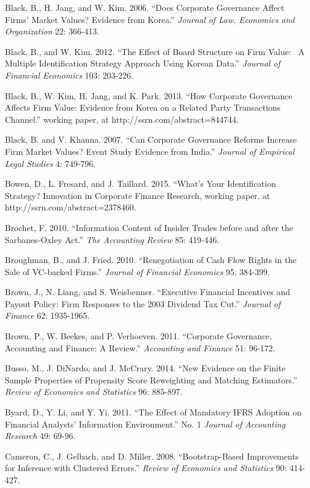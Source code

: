 \noindent Black, B., H. Jang, and W. Kim. 2006. ``Does Corporate Governance Affect Firms' Market Values?  Evidence from Korea.''  \textit{Journal of Law, Economics and Organization} 22: 366-413.

\noindent Black, B., and W. Kim. 2012. ``The Effect of Board Structure on Firm Value:~ A Multiple Identification Strategy Approach Using Korean Data.''  \textit{Journal of Financial Economics }103: 203-226.

\noindent Black, B., W. Kim, H. Jang, and K. Park. 2013. ``How Corporate Governance Affects Firm Value:  Evidence from Korea on a Related Party Transactions Channel.'' working paper, at http://ssrn.com/abstract=844744.

\noindent Black, B. and V. Khanna. 2007. ``Can Corporate Governance Reforms Increase Firm Market Values? Event Study Evidence from India.''  \textit{Journal of Empirical Legal Studies} 4: 749-796.

\noindent Bowen, D., L. Fresard, and J. Taillard. 2015. ``What's Your Identification Strategy?  Innovation in Corporate Finance Research, working paper, at http://ssrn.com/abstract=2378460. 

\noindent Brochet, F. 2010. ``Information Content of Insider Trades before and after the Sarbanes-Oxley Act.''  \textit{The Accounting Review} 85: 419-446. 

\noindent Broughman, B., and J. Fried. 2010. ``Renegotiation of Cash Flow Rights in the Sale of VC-backed Firms.''  \textit{Journal of Financial Economics} 95: 384-399.

\noindent Brown, J., N. Liang, and S. Weisbenner. ``Executive Financial Incentives and Payout Policy: Firm Responses to the 2003 Dividend Tax Cut.''  \textit{Journal of Finance} 62: 1935-1965.

\noindent Brown, P., W. Beekes, and P. Verhoeven. 2011. ``Corporate Governance, Accounting and Finance:  A Review.''  \textit{Accounting and Finance} 51: 96-172.

\noindent Busso, M., J. DiNardo, and J. McCrary. 2014. ``New Evidence on the Finite Sample Properties of Propensity Score Reweighting and Matching Estimators.'' \textit{Review of Economics and Statistics }96:  885-897.

\noindent Byard, D., Y. Li, and Y. Yi. 2011. ``The Effect of Mandatory IFRS Adoption on Financial Analysts' Information Environment.''  No. 1 \textit{Journal of Accounting Research }49: 69-96.

\noindent Cameron, C., J. Gelbach, and D. Miller. 2008. ``Bootstrap-Based Improvements for Inference with Clustered Errors.''  \textit{Review of Economics and Statistics} 90: 414-427.

